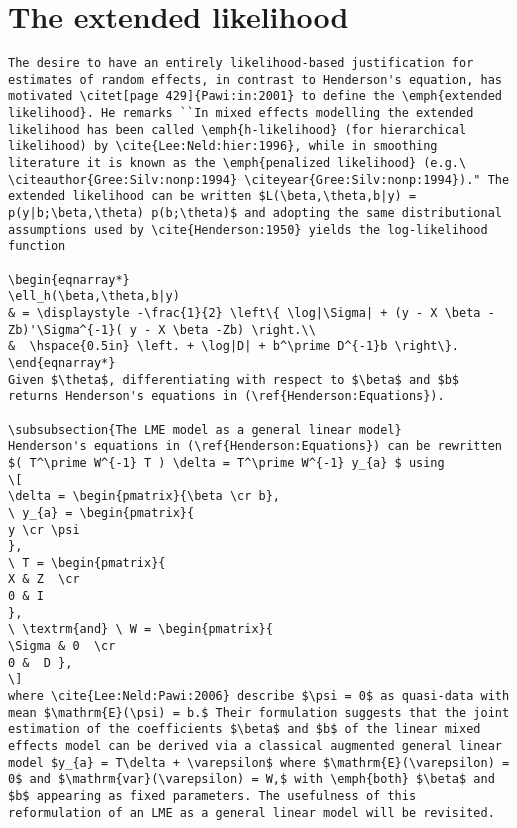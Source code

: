 \documentclass[MAIN.tex]{subfiles}
\begin{document}
\section{The extended likelihood}
\begin{verbatim}
The desire to have an entirely likelihood-based justification for estimates of random effects, in contrast to Henderson's equation, has motivated \citet[page 429]{Pawi:in:2001} to define the \emph{extended likelihood}. He remarks ``In mixed effects modelling the extended likelihood has been called \emph{h-likelihood} (for hierarchical  likelihood) by \cite{Lee:Neld:hier:1996}, while in smoothing literature it is known as the \emph{penalized likelihood} (e.g.\ \citeauthor{Gree:Silv:nonp:1994} \citeyear{Gree:Silv:nonp:1994})." The extended likelihood can be written $L(\beta,\theta,b|y) = p(y|b;\beta,\theta) p(b;\theta)$ and adopting the same distributional assumptions used by \cite{Henderson:1950} yields the log-likelihood function

\begin{eqnarray*}
\ell_h(\beta,\theta,b|y)
& = \displaystyle -\frac{1}{2} \left\{ \log|\Sigma| + (y - X \beta -Zb)'\Sigma^{-1}( y - X \beta -Zb) \right.\\
&  \hspace{0.5in} \left. + \log|D| + b^\prime D^{-1}b \right\}.
\end{eqnarray*}
Given $\theta$, differentiating with respect to $\beta$ and $b$ returns Henderson's equations in (\ref{Henderson:Equations}).

\subsubsection{The LME model as a general linear model}
Henderson's equations in (\ref{Henderson:Equations}) can be rewritten $( T^\prime W^{-1} T ) \delta = T^\prime W^{-1} y_{a} $ using
\[
\delta = \begin{pmatrix}{\beta \cr b},
\ y_{a} = \begin{pmatrix}{
y \cr \psi
},
\ T = \begin{pmatrix}{
X & Z  \cr
0 & I
},
\ \textrm{and} \ W = \begin{pmatrix}{
\Sigma & 0  \cr
0 &  D },
\]
where \cite{Lee:Neld:Pawi:2006} describe $\psi = 0$ as quasi-data with mean $\mathrm{E}(\psi) = b.$ Their formulation suggests that the joint estimation of the coefficients $\beta$ and $b$ of the linear mixed effects model can be derived via a classical augmented general linear model $y_{a} = T\delta + \varepsilon$ where $\mathrm{E}(\varepsilon) = 0$ and $\mathrm{var}(\varepsilon) = W,$ with \emph{both} $\beta$ and $b$ appearing as fixed parameters. The usefulness of this reformulation of an LME as a general linear model will be revisited.

\end{verbatim}
\end{document}
